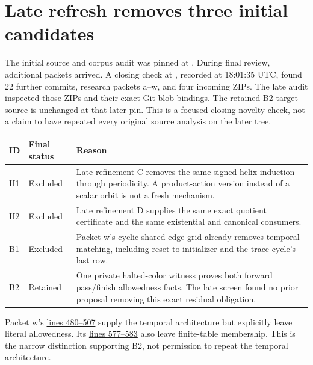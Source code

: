 \section{Late refresh removes three initial candidates}

The initial source and corpus audit was pinned at . During final review, additional packets arrived. A closing check at , recorded at 18:01:35 UTC, found 22 further commits, research packets a--w, and four incoming ZIPs. The late audit inspected those ZIPs and their exact Git-blob bindings. The retained B2 target source is unchanged at that later pin. This is a focused closing novelty check, not a claim to have repeated every original source analysis on the later tree.

\begin{tabularx}{\linewidth}{@{}L{0.4in}L{0.85in}Y@{}}
\toprule
ID & Final status & Reason \\
\midrule
H1 & Excluded & Late refinement C removes the same signed helix induction through periodicity. A product-action version instead of a scalar orbit is not a fresh mechanism. \\
H2 & Excluded & Late refinement D supplies the same exact quotient certificate and the same existential and canonical consumers. \\
B1 & Excluded & Packet w's cyclic shared-edge grid already removes temporal matching, including reset to initializer and the trace cycle's last row. \\
B2 & Retained & One private halted-color witness proves both forward pass/finish allowedness facts. The late screen found no prior proposal removing this exact residual obligation. \\
\bottomrule
\end{tabularx}

Packet w's \href{https://github.com/VladimirReshetnikov/ProveIt/blob/09d65a93c9df8684c1a226341d6a5120623d1cdb/Computability/DiophantineConsistency/research/lean-proof-simplification/2026-10-26w/report.tex\#L480-L507}{lines 480--507} supply the temporal architecture but explicitly leave literal allowedness. Its \href{https://github.com/VladimirReshetnikov/ProveIt/blob/09d65a93c9df8684c1a226341d6a5120623d1cdb/Computability/DiophantineConsistency/research/lean-proof-simplification/2026-10-26w/report.tex\#L577-L583}{lines 577--583} also leave finite-table membership. This is the narrow distinction supporting B2, not permission to repeat the temporal architecture.

